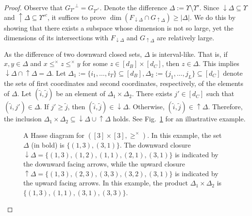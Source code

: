\documentclass[12pt]{article}
\theoremstyle{definition}
\numberwithin{equation}{section}
\numberwithin{equation}{section}
\newcommand{\Ups}{\Upsilon}
\newcommand{\da}{\downarrow}
\newcommand{\ua}{\uparrow}
\begin{document}
\begin{proof} 
Observe that \({G_{\Ups'}}^\perp = G_{{\Ups'}^c}\). Denote the difference \(\Delta := \Ups \setminus \Ups'\). Since \(\da \Delta \subseteq \Ups\) and \(\ua \Delta \subseteq {\Ups'}^c\), 
it suffices to prove \(\dim ( F_{\da \Delta} \cap G_{\ua \Delta}) \geq |\Delta|.\) We do this by showing that there exists a subspace whose dimension is not so large, yet the dimensions of its intersections with \(F_{\da \Delta}\) and \(G_{\ua \Delta}\) are relatively large. 

As the difference of two downward closed sets, \(\Delta\) is interval-like. That is, if \(x,y \in \Delta\) and \(x \leq^\times z \leq^\times y\) for some \(z \in [d_B] \times [d_C]\), then \(z \in \Delta\). This implies \({\da \Delta} \cap {\ua \Delta} = \Delta\). Let \(\Delta_1 := \{i_1, \ldots, i_{T}\} \subseteq [d_B], \Delta_2 := \{ j_1, \ldots, j_{L}\} \subseteq [d_C]\) denote the sets of first coordinates and second coordinates, respectively, of the elements of \(\Delta\).  Let \((\tilde{i},\tilde{j})\) be an element of \(\Delta_1 \times \Delta_2\). There exists \(j' \in [d_C]\) such that \((\tilde{i},j') \in \Delta\). If \(j' \geq \tilde{j}\), then \((\tilde{i},\tilde{j}) \in  {\da \Delta}\). Otherwise, \( (\tilde{i}, \tilde{j}) \in {\ua \Delta}\). Therefore, the inclusion \(\Delta_1 \times \Delta_2 \subseteq  {\da \Delta} \cup {\ua \Delta}\) holds. See Fig.~\ref{fig: Hasse diagram for 3by3 with delta} for an illustrative example. 

\begin{figure}
\centering
{}
\caption{\small{A Hasse diagram for \(([3] \times [3], \geq^\times)\). In this example, the set \(\Delta\) (in bold) is \(\{(1,3), (3,1)\}\). The downward closure \({\da\Delta} = \{ (1,3), (1,2), (1,1), (2,1), (3,1)\}\) is indicated by the downward facing arrows, while the upward closure \({\ua\Delta} = \{ (1,3),(2,3), (3,3), (3,2), (3,1)\}\) is indicated by the upward facing arrows. In this example, the product \(\Delta_1 \times \Delta_2\) is  \(\{ (1,3), (1,1), (3,1), (3,3)\}\).}} 
\label{fig: Hasse diagram for 3by3 with delta}
\end{figure}



\end{proof}
\end{document}

